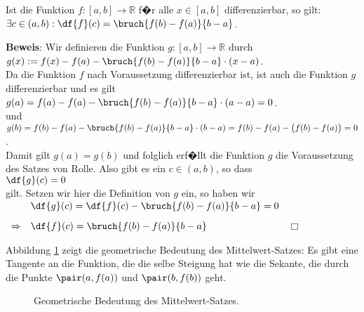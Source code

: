 \begin{Satz}
  Ist die Funktion $f:[a,b] \rightarrow \mathbb{R}$ f�r alle $x\in[a,b]$ differenzierbar, 
  so gilt: 
  \\[0.3cm]
  \hspace*{1.3cm}
  $\exists c \in (a,b): \df{f}(c) = \bruch{f(b) - f(a)}{b - a}$.
\end{Satz}

\noindent
\textbf{Beweis}: Wir definieren die Funktion $g:[a,b] \rightarrow \mathbb{R}$ durch
\\[0.3cm]
\hspace*{1.3cm} $g(x) := f(x) - f(a) - \bruch{f(b) - f(a)}{b-a}\cdot (x-a)$.
\\[0.3cm]
Da die Funktion $f$ nach Voraussetzung differenzierbar ist, ist auch die Funktion $g$ differenzierbar und es gilt 
\\[0.3cm]
\hspace*{1.3cm}
$g(a) = f(a) - f(a) - \bruch{f(b) - f(a)}{b-a}\cdot (a-a) =0$.
\\[0.0cm]
und
\\[0.0cm]
\hspace*{1.3cm} $g(b) = f(b) - f(a) - \bruch{f(b) - f(a)}{b-a}\cdot (b-a) = f(b) - f(a) - \bigl(f(b) - f(a)\bigr) = 0$.
\\[0.3cm]
Damit gilt $g(a) = g(b)$ und folglich erf�llt die Funktion $g$ die Voraussetzung des Satzes von Rolle.  Also gibt es ein
$c \in (a,b)$, so dass 
\\[0.3cm]
\hspace*{1.3cm}
$\df{g}(c) = 0$
\\[0.3cm]
gilt.  Setzen wir hier die Definition von $g$ ein, so haben wir 
\\[0.3cm]
\hspace*{1.3cm}
$
\begin{array}[b]{ll}
            & \df{g}(c) = \df{f}(c) - \bruch{f(b) - f(a)}{b-a} = 0 \\[0.3cm]
\Rightarrow & \df{f}(c) = \bruch{f(b) - f(a)}{b-a}
\end{array}
$
\hspace*{\fill} $\Box$
\vspace*{0.3cm}

Abbildung \ref{fig:mean-value-theorem} zeigt die geometrische Bedeutung des
Mittelwert-Satzes:  Es gibt eine Tangente an die Funktion, die die selbe Steigung hat wie
die Sekante, die durch die Punkte $\pair(a,f(a))$ und $\pair(b,f(b))$  geht.
      \begin{figure}[!h]
        \centering
        \caption{Geometrische Bedeutung des Mittelwert-Satzes.}
        \label{fig:mean-value-theorem}
      \end{figure}

